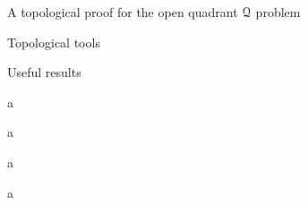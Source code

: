 \documentclass[11pt, a4paper, english, twoside, notitlepage, openright]{report}
\begin{document}
\begin{chapter}{A topological proof for the open quadrant $\mathcal{Q}$ problem}
\begin{section}{Topological tools}
\begin{subsection}{Useful results}
\begin{lemma}\label{lemmaFundGr}
a
\end{lemma}

\begin{lemma}\label{lemmaZ}
a
\end{lemma}

\begin{lemma}\label{lemmaId}
a
\end{lemma}

\begin{proposition}\label{propTop}
a
\end{proposition}

\end{subsection}

\end{section}

\end{chapter}
\end{document}
